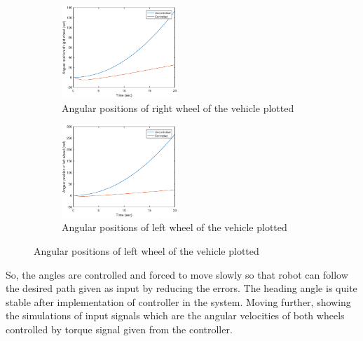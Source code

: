 \documentclass[12pt]{article}
\begin{document}
\begin{figure}[H]
\begin{subfigure}{0.5\textwidth}
\includegraphics[width=0.7\linewidth, height=3.5cm]{state_theta_r.eps}
\captionsetup{labelformat=empty}
\caption{Angular positions of right wheel of the vehicle plotted}
\end{subfigure}
\begin{subfigure}{0.5\textwidth}
\includegraphics[width=0.7\linewidth, height=3.5cm]{state_theta_l.eps}
\captionsetup{labelformat=empty}
\caption{Angular positions of left wheel of the vehicle plotted}
\end{subfigure}
\end{figure}

So, the angles are controlled and forced to move slowly so that robot can follow the desired path given as input by reducing the errors. The heading angle is quite stable after implementation of controller in the system. Moving further, showing the simulations of input signals which are the angular velocities of both wheels controlled by torque signal given from the controller.
\end{document}
